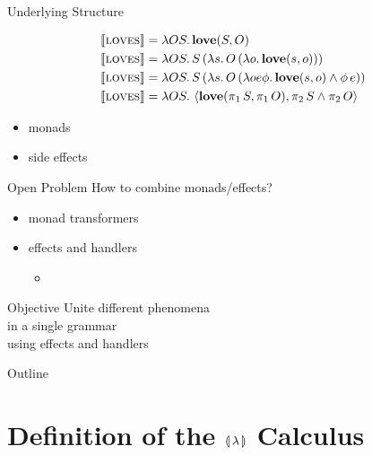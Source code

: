 \documentclass{beamer}
\begin{document}
\begin{frame}{Underlying Structure}

  \begin{align*}
    \llbracket \textsc{loves} \rrbracket &= \lambda O S.\, \textbf{love}(S, O) \\
    \llbracket \textsc{loves} \rrbracket &= \lambda O S.\, S\,(\lambda s.\, O\,(\lambda o.\, \textbf{love}(s, o))) \\
    \llbracket \textsc{loves} \rrbracket &= \lambda O S.\, S\,(\lambda s.\, O\,(\lambda o e \phi.\, \textbf{love}(s, o) \land \phi\,e)) \\
    \llbracket \textsc{loves} \rrbracket &= \lambda O S.\, \left< \textbf{love}(\pi_1\,S, \pi_1\,O), \pi_2\,S \land \pi_2\,O \right>
  \end{align*}

  \vfill
  \pause

  \begin{itemize}
  \item monads~\cite{shan2002monads}
  \item side effects~\cite{shan2005linguistic}
  \end{itemize}
\end{frame}


\begin{frame}{Open Problem}
  How to combine monads/effects?
  \begin{itemize}
  \item monad transformers
  \item \alert<2>{effects and handlers}
    \pause
    \begin{itemize}
    \item \cite{cartwright1994extensible,kiselyov2013extensible,plotkin2013handling,bauer2012programming,kammar2013handlers}
    \end{itemize}
  \end{itemize}
\end{frame}


\begin{frame}[standout]{Objective}
  Unite different phenomena \\
  in a single grammar \\
  using effects and handlers
\end{frame}


\begin{frame}{Outline}
  \tableofcontents[hideallsubsections]
\end{frame}



\section{Definition of the \texorpdfstring{${\llparenthesis \, \lambda \, \rrparenthesis}$}{} Calculus}
\end{document}
